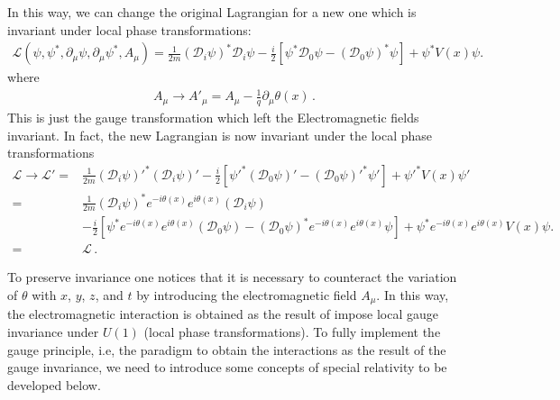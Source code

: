In this way, we can change the original Lagrangian for a new one which is invariant under local phase transformations:
\begin{align}
   \mathcal{L}(\psi,\psi^*,\partial_\mu\psi,\partial_\mu\psi^*,A_\mu)
=\frac{1}{2m}\left(\mathcal{D}_i\psi\right)^*\mathcal{D}_i\psi-\frac{i}{2}
  \left[\psi^*\mathcal{D}_0\psi-\left(\mathcal{D}_0\psi\right)^*\psi\right]+\psi^*V(x)\psi.
\end{align}
where
\begin{align}
\label{eq:167qft}
  A_\mu\to A'_\mu=A_\mu-\frac{1}{q}\partial_\mu\theta(x)\,.
\end{align}
This is just the gauge transformation which left the Electromagnetic fields invariant. In fact, the new Lagrangian is now invariant under the local phase transformations
\begin{align}
  \mathcal{L}\to \mathcal{L}'=&
\frac{1}{2m}{\left(\mathcal{D}_i\psi\right)'}^*\left(\mathcal{D}_i\psi\right)'
-\frac{i}{2}\left[{\psi'}^*\left(\mathcal{D}_0\psi\right)'-{\left(\mathcal{D}_0\psi\right)'}^*\psi'\right]+{\psi'}^*V(x)\psi'\nonumber\\
=&
\frac{1}{2m}{\left(\mathcal{D}_i\psi\right)}^*e^{-i\theta(x)}e^{i\theta(x)}\left(\mathcal{D}_i\psi\right)\nonumber\\
&-\frac{i}{2}\left[{\psi}^*e^{-i\theta(x)}e^{i\theta(x)}\left(\mathcal{D}_0\psi\right)
-{\left(\mathcal{D}_0\psi\right)}^*e^{-i\theta(x)}e^{i\theta(x)}\psi\right]+{\psi}^*e^{-i\theta(x)}e^{i\theta(x)}V(x)\psi.\nonumber\\
=&\mathcal{L}\,.
\end{align}

To preserve invariance one notices that it is necessary to counteract the variation of $\theta$ with $x$, $y$, $z$, and $t$ by introducing the electromagnetic field $A_\mu$. In this way, the electromagnetic interaction is obtained as the result of impose local gauge invariance under $U(1)$ (local phase transformations). To fully implement the gauge principle, i.e, the paradigm to obtain the interactions as the result of the gauge invariance, we need to introduce some concepts of special relativity to be developed below.


